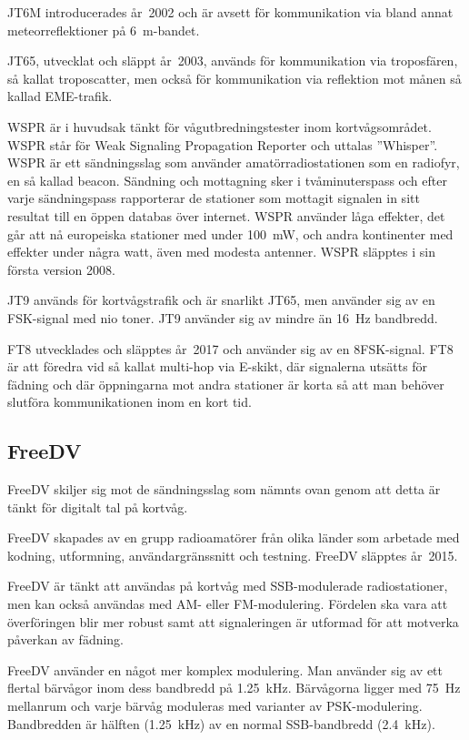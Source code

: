 JT6M introducerades år~2002 och är avsett för kommunikation via bland annat
meteorreflektioner på \qty{6}{\metre}-bandet.

JT65, utvecklat och släppt år~2003, används för kommunikation via troposfären,
så kallat troposcatter, men också för kommunikation via reflektion mot månen
så kallad EME-trafik.

WSPR är i huvudsak tänkt för vågutbredningstester inom kortvågsområdet.
WSPR står för Weak Signaling Propagation Reporter och uttalas ''Whisper''.
WSPR är ett sändningsslag som använder amatörradiostationen som en radiofyr, en
så kallad beacon.
Sändning och mottagning sker i tvåminuterspass och efter varje sändningspass
rapporterar de stationer som mottagit signalen in sitt resultat till en öppen
databas över internet.
WSPR använder låga effekter, det går att nå europeiska stationer med under
\qty{100}{\milli\watt}, och andra kontinenter med effekter under några watt,
även med modesta antenner.
WSPR släpptes i sin första version 2008.

JT9 används för kortvågstrafik och är snarlikt JT65, men använder sig av en
FSK-signal med nio toner.
JT9 använder sig av mindre än \qty{16}{\hertz} bandbredd.

FT8 utvecklades och släpptes år~2017 och använder sig av en 8FSK-signal.
FT8 är att föredra vid så kallat multi-hop via E-skikt, där signalerna utsätts
för fädning och där öppningarna mot andra stationer är korta så att man behöver
slutföra kommunikationen inom en kort tid.

\subsection{FreeDV}

FreeDV skiljer sig mot de sändningsslag som nämnts ovan genom att detta är tänkt
för digitalt tal på kortvåg.

FreeDV skapades av en grupp radioamatörer från olika länder som arbetade
med kodning, utformning, användargränssnitt och testning.
FreeDV släpptes år~2015.

FreeDV är tänkt att användas på kortvåg med SSB-modulerade radiostationer,
men kan också användas med AM- eller FM-modulering.
Fördelen ska vara att överföringen blir mer robust samt att signaleringen är
utformad för att motverka påverkan av fädning.

FreeDV använder en något mer komplex modulering.
Man använder sig av ett flertal bärvågor inom dess bandbredd på
\qty{1,25}{\kilo\hertz}.
Bärvågorna ligger med \qty{75}{\hertz} mellanrum och varje bärvåg moduleras med
varianter av PSK-modulering.
Bandbredden är hälften (\qty{1,25}{\kilo\hertz}) av en normal SSB-bandbredd
(\qty{2,4}{\kilo\hertz}).
